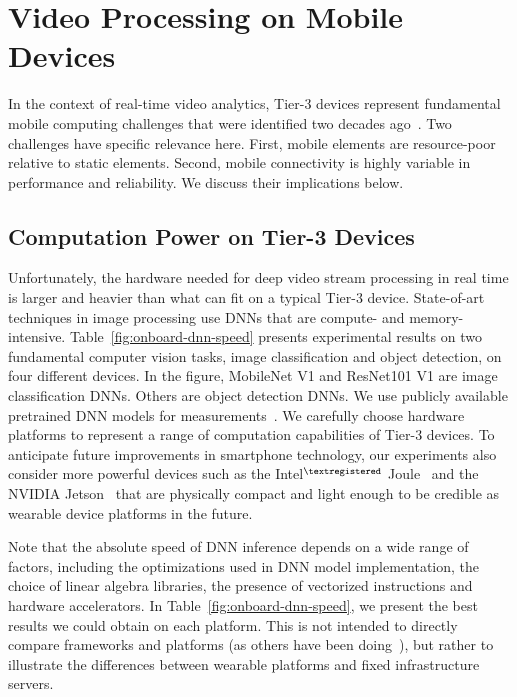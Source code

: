 \section{Video Processing on Mobile Devices}
\label{bw:challenges}

In the context of real-time video analytics, Tier-3 devices represent
fundamental mobile computing challenges that were identified two decades
ago~\cite{Satya1996}.  Two challenges have specific relevance here. First,
mobile elements are resource-poor relative to static elements.  Second, mobile
connectivity is highly variable in performance and reliability.  We discuss
their implications below.


\subsection{Computation Power on Tier-3 Devices}
\label{bw:payload}

Unfortunately, the hardware needed for deep video stream processing in real time
is larger and heavier than what can fit on a typical Tier-3 device. State-of-art
techniques in image processing use DNNs that are compute- and memory-intensive.
Table~\ref{fig:onboard-dnn-speed} presents experimental results on two
fundamental computer vision tasks, image classification and object detection, on
four different devices. In the figure, MobileNet V1 and ResNet101 V1 are image
classification DNNs. Others are object detection DNNs. We use publicly available
pretrained DNN models for measurements~\cite{tfod2019}. We carefully choose
hardware platforms to represent a range of computation capabilities of Tier-3
devices. To anticipate future improvements in smartphone technology, our
experiments also consider more powerful devices such as the
Intel$^{\tiny\textregistered}$ Joule~\cite{Hardawar2016} and the NVIDIA
Jetson~\cite{NVIDIA2017} that are physically compact and light enough to be
credible as wearable device platforms in the future.

Note that the absolute speed of DNN inference depends on a wide range of
factors, including the optimizations used in DNN model implementation, the
choice of linear algebra libraries, the presence of vectorized instructions and
hardware accelerators. In Table~\ref{fig:onboard-dnn-speed}, we present the best
results we could obtain on each platform. This is not intended to directly
compare frameworks and platforms (as others have been
doing~\cite{Zhang2018pcamp}), but rather to illustrate the differences between
wearable platforms and fixed infrastructure servers. 

